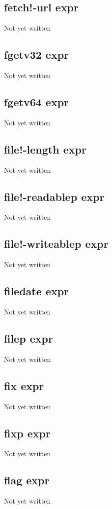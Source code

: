 \documentclass[a4paper,11pt]{article}
\begin{document}
\subsection{\ttfamily fetch!-url expr}
Not yet written

\subsection{\ttfamily fgetv32 expr}
Not yet written

\subsection{\ttfamily fgetv64 expr}
Not yet written

\subsection{\ttfamily file!-length expr}
Not yet written

\subsection{\ttfamily file!-readablep expr}
Not yet written

\subsection{\ttfamily file!-writeablep expr}
Not yet written

\subsection{\ttfamily filedate expr}
Not yet written

\subsection{\ttfamily filep expr}
Not yet written

\subsection{\ttfamily fix expr}
Not yet written

\subsection{\ttfamily fixp expr}
Not yet written

\subsection{\ttfamily flag expr}
Not yet written
\end{document}
